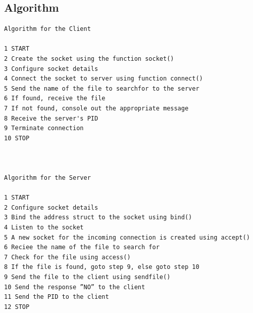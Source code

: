 \subsection{Algorithm}
\begin{verbatim}
Algorithm for the Client

1 START
2 Create the socket using the function socket()
3 Configure socket details
4 Connect the socket to server using function connect()
5 Send the name of the file to searchfor to the server
6 If found, receive the file
7 If not found, console out the appropriate message 
8 Receive the server's PID 
9 Terminate connection
10 STOP



Algorithm for the Server

1 START
2 Configure socket details
3 Bind the address struct to the socket using bind()
4 Listen to the socket
5 A new socket for the incoming connection is created using accept()
6 Reciee the name of the file to search for
7 Check for the file using access()
8 If the file is found, goto step 9, else goto step 10
9 Send the file to the client using sendfile()
10 Send the response ”NO” to the client
11 Send the PID to the client
12 STOP
\end{verbatim}

